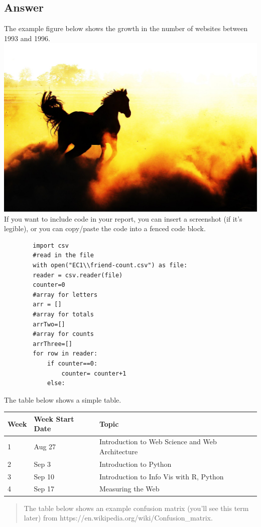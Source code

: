 \documentclass{article}
\begin{document}
	\subsection*{Answer}
	The example figure below shows the growth in the number of websites between 1993 and 1996.
    \\
    \includegraphics[scale=0.2]{images/horse.jpg}
    \\
    If you want to include code in your report, you can insert a screenshot (if it's legible), or you can copy/paste the code into a fenced code block.
    \begin{verbatim}
        import csv
        #read in the file
        with open("EC1\\friend-count.csv") as file:
        reader = csv.reader(file)
        counter=0
        #array for letters
        arr = []
        #array for totals   
        arrTwo=[] 
        #array for counts
        arrThree=[]
        for row in reader:
            if counter==0:
                counter= counter+1
            else:
    \end{verbatim}
	The table below shows a simple table.
\begin{table}[!ht]
    \centering
    \begin{tabular}{|l|l|l|}
    \hline
        Week & Week Start Date & Topic \\ \hline
        1 & Aug 27 & Introduction to Web Science and Web Architecture \\ \hline
        2 & Sep 3 & Introduction to Python \\ \hline
        3 & Sep 10 & Introduction to Info Vis with R, Python \\ \hline
        4 & Sep 17 & Measuring the Web \\ \hline
    \end{tabular}
\end{table}
\begin{abstract}
    The table below shows an example confusion matrix (you'll see this term later) from https://en.wikipedia.org/wiki/Confusion\_matrix. 
\end{abstract}
   
\end{document}
